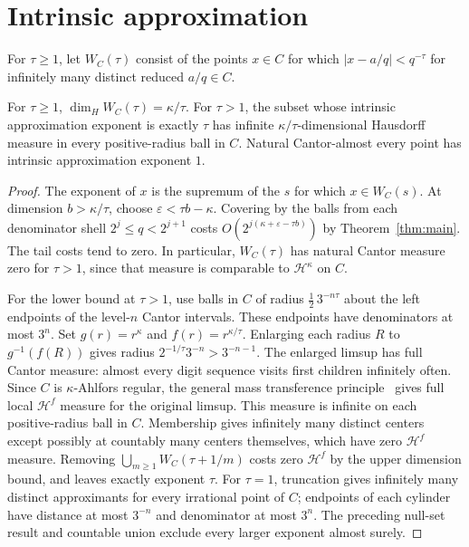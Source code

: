 \section{Intrinsic approximation}\label{sec:metric}

For \(\tau\ge1\), let \(W_C(\tau)\) consist of the points \(x\in C\)
for which \(|x-a/q|<q^{-\tau}\) for infinitely many distinct reduced
\(a/q\in C\).

\begin{corollary}\label{cor:dimension}
For \(\tau\ge1\), \(\dim_H W_C(\tau)=\kappa/\tau\).
For \(\tau>1\), the subset whose intrinsic approximation exponent
is exactly \(\tau\) has infinite \(\kappa/\tau\)-dimensional Hausdorff
measure in every positive-radius ball in \(C\). Natural Cantor-almost
every point has intrinsic approximation exponent \(1\).
\end{corollary}

\begin{proof}
The exponent of \(x\) is the supremum of the \(s\) for which
\(x\in W_C(s)\). At dimension \(b>\kappa/\tau\), choose
\(\varepsilon<\tau b-\kappa\). Covering by the balls from each
denominator shell \(2^j\le q<2^{j+1}\) costs
\(O(2^{j(\kappa+\varepsilon-\tau b)})\) by
Theorem~\ref{thm:main}. The tail costs tend to zero. In particular,
\(W_C(\tau)\) has natural Cantor measure zero for \(\tau>1\),
since that measure is comparable to \(\mathcal H^\kappa\) on \(C\).

For the lower bound at \(\tau>1\), use balls in \(C\) of radius
\(\frac12\,3^{-n\tau}\) about the left endpoints of the level-\(n\)
Cantor intervals. These endpoints have denominators at most \(3^n\).
Set \(g(r)=r^\kappa\) and \(f(r)=r^{\kappa/\tau}\). Enlarging each
radius \(R\) to \(g^{-1}(f(R))\) gives radius
\(2^{-1/\tau}3^{-n}>3^{-n-1}\). The enlarged limsup has full Cantor
measure: almost every digit sequence visits first children infinitely
often. Since \(C\) is \(\kappa\)-Ahlfors regular, the general mass
transference principle~\cite[Theorem~3]{BV2006} gives full local
\(\mathcal H^f\) measure for the original limsup. This measure is
infinite on each positive-radius ball in \(C\). Membership gives
infinitely many distinct centers except possibly at countably many
centers themselves, which have zero \(\mathcal H^f\) measure.
Removing \(\bigcup_{m\ge1}W_C(\tau+1/m)\) costs zero
\(\mathcal H^f\) by the upper dimension bound, and leaves exactly
exponent \(\tau\). For \(\tau=1\), truncation gives infinitely many
distinct approximants for every irrational point of \(C\); endpoints
of each cylinder have distance at most \(3^{-n}\) and denominator
at most \(3^n\). The preceding null-set result and countable union
exclude every larger exponent almost surely.
\end{proof}
